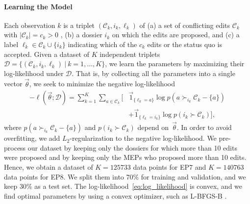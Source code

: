 \paragraph{Learning the Model}
Each observation $k$ is a triplet $ ( \mathcal{C}_k, i_k, \ell_k )$ of (a) a set of conflicting edits $ \mathcal{C}_k $ with $ | \mathcal{C}_k | = c_k > 0 $ , (b) a dossier $ i_k $ on which the edits are proposed, and (c) a label $ \ell_k \in \mathcal{C}_k \cup \{ i_k \} $ indicating which of the $c_k$ edits or the status quo is accepted.
Given a dataset of $K$ independent triplets \mbox{$\mathcal{D} = \{ ( \mathcal{C}_k, i_k, \ell_k )~\vert~k = 1, ..., K \}$}, we learn the parameters by maximizing their log-likelihood under $ \mathcal{D} $.
That is, by collecting all the parameters into a single vector $ \vec{\theta} $, we seek to minimize the negative log-likelihood
\begin{align}
	\label{eq:log_likelihood}
	- \ell(\vec{\theta} ; \mathcal{D})
	= \sum_{k = 1}^K  \sum_{a \in \mathcal{C}_k} \Biggl[ & \vec{1}_{\{\ell_k = a\}} \log p\left(a \succ_{i_k} \mathcal{C}_k - \{ a \} \right)  \nonumber \\
	                                                     & + \vec{1}_{\{\ell_k = i_k\}} \log p\left(i_k \succ \mathcal{C}_k \right) \Biggr],
\end{align}
where $ p\left(a \succ_{i_k} \mathcal{C}_k - \{ a \} \right) $ and $ p\left(i_k \succ \mathcal{C}_k \right) $ depend on~$\vec{\theta}$.
In order to avoid overfitting, we add $L_2$-regularization to the negative log-likelihood.
We pre-process our dataset by keeping only the dossiers for which more than 10 edits were proposed and by keeping only the MEPs who proposed more than 10 edits.
Hence, we obtain a dataset of $K=125733$ data points for EP7 and $K=140763$ data points for EP8.
We split them into 70\% for training and validation, and we keep 30\% as a test set.
The log-likelihood~\eqref{eq:log_likelihood} is convex, and we find optimal parameters by using a convex optimizer, such as L-BFGS-B \cite{byrd1995limited}.
